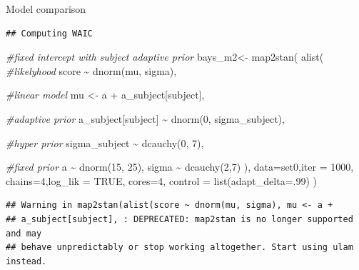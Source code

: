 \documentclass[
  ignorenonframetext,
]{beamer}
\newenvironment{Shaded}{\begin{snugshade}}{\end{snugshade}}
\newcommand{\AttributeTok}[1]{\textcolor[rgb]{0.77,0.63,0.00}{#1}}
\newcommand{\CommentTok}[1]{\textcolor[rgb]{0.56,0.35,0.01}{\textit{#1}}}
\newcommand{\ConstantTok}[1]{\textcolor[rgb]{0.00,0.00,0.00}{#1}}
\newcommand{\DecValTok}[1]{\textcolor[rgb]{0.00,0.00,0.81}{#1}}
\newcommand{\FunctionTok}[1]{\textcolor[rgb]{0.00,0.00,0.00}{#1}}
\newcommand{\NormalTok}[1]{#1}
\newcommand{\OtherTok}[1]{\textcolor[rgb]{0.56,0.35,0.01}{#1}}
\newcommand{\SpecialCharTok}[1]{\textcolor[rgb]{0.00,0.00,0.00}{#1}}
\begin{document}
\begin{frame}[fragile]{Model comparison}
\begin{verbatim}
## Computing WAIC
\end{verbatim}

\begin{Shaded}
\begin{Highlighting}[]
\CommentTok{\#fixed intercept with subject adaptive prior}
\NormalTok{bays\_m2}\OtherTok{\textless{}{-}} \FunctionTok{map2stan}\NormalTok{(}
  \FunctionTok{alist}\NormalTok{(}
    \CommentTok{\#likelyhood}
\NormalTok{    score }\SpecialCharTok{\textasciitilde{}} \FunctionTok{dnorm}\NormalTok{(mu, sigma),}
    
    \CommentTok{\#linear model}
\NormalTok{    mu }\OtherTok{\textless{}{-}}\NormalTok{ a }\SpecialCharTok{+}\NormalTok{ a\_subject[subject],}
    
    \CommentTok{\#adaptive prior}
\NormalTok{    a\_subject[subject] }\SpecialCharTok{\textasciitilde{}} \FunctionTok{dnorm}\NormalTok{(}\DecValTok{0}\NormalTok{, sigma\_subject),}
    
    \CommentTok{\#hyper prior}
\NormalTok{    sigma\_subject }\SpecialCharTok{\textasciitilde{}} \FunctionTok{dcauchy}\NormalTok{(}\DecValTok{0}\NormalTok{, }\DecValTok{7}\NormalTok{),}
    
    \CommentTok{\#fixed prior}
\NormalTok{    a }\SpecialCharTok{\textasciitilde{}} \FunctionTok{dnorm}\NormalTok{(}\DecValTok{15}\NormalTok{, }\DecValTok{25}\NormalTok{),}
\NormalTok{    sigma }\SpecialCharTok{\textasciitilde{}} \FunctionTok{dcauchy}\NormalTok{(}\DecValTok{2}\NormalTok{,}\DecValTok{7}\NormalTok{)}
\NormalTok{  ),}
  \AttributeTok{data=}\NormalTok{set0,}\AttributeTok{iter =} \DecValTok{1000}\NormalTok{,}
  \AttributeTok{chains=}\DecValTok{4}\NormalTok{,}\AttributeTok{log\_lik =} \ConstantTok{TRUE}\NormalTok{,}
  \AttributeTok{cores=}\DecValTok{4}\NormalTok{, }\AttributeTok{control =} \FunctionTok{list}\NormalTok{(}\AttributeTok{adapt\_delta=}\NormalTok{.}\DecValTok{99}\NormalTok{)}
\NormalTok{)}
\end{Highlighting}
\end{Shaded}

\begin{verbatim}
## Warning in map2stan(alist(score ~ dnorm(mu, sigma), mu <- a +
## a_subject[subject], : DEPRECATED: map2stan is no longer supported and may
## behave unpredictably or stop working altogether. Start using ulam instead.
\end{verbatim}


\end{frame}
\end{document}
